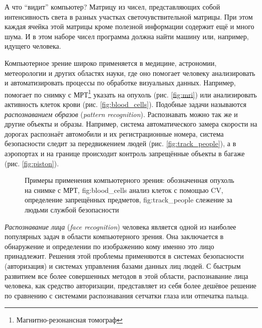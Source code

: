 \documentclass[12pt]{report}
\begin{document}
А что ``видит'' компьютер? Матрицу из чисел, представляющих собой интенсивность света в разных участках 
светочувствительной матрицы. При этом каждая ячейка этой матрицы кроме полезной информации содержит ещё и много 
шума. И в 
этом наборе чисел программа должна найти машину или, например, идущего человека.

Компьютерное зрение широко применяется в медицине, астрономии, метеорологии и других областях науки, где оно 
помогает человеку анализировать и автоматизировать процессы по обработке визуальных данных. 
Например, помогает по снимку с МРТ\footnote{Магнитно-резонансная томограф} указать на опухоль (рис. \ref{fig:mri}) 
или 
анализировать активность клеток крови (рис. \ref{fig:blood_cells}). Подобные задачи называются \emph{распознаванием 
образов} 
(\textit{pattern recognition}). Распознавать можно так же и другие объекты и образы. Например, система 
автоматического 
замера скорости на дорогах распознаёт автомобили и их регистрационные номера, система безопасности следит за
передвижением людей (рис. \ref{fig:track_people}), а в аэропортах и на границе происходит контроль запрещённые 
объекты в багаже (рис. \ref{fig:piston}).

\begin{figure}[h]
	\centering
		
	\caption{Примеры применения компьютерного зрения:  обозначенная опухоль на снимке с МРТ, 
\subref
{fig:blood_cells} анализ клеток с помощью CV,  определение запрещённых предметов, \subref
{fig:track_people} слежение за людьми службой безопасности}
	\label{fig:cv_usage}
\end{figure}


\emph{Распознавание лица} (\textit{face recognition}) человека является одной из наиболее популярных задач в 
области 
компьютерного зрения. Она заключается в обнаружение и определении по изображению кому именно это лицо принадлежит. 
Решения этой проблемы применяются в системах безопасности (авторизация) и системах управления базами данных лиц 
людей. %
С быстрым развитием все более совершенных методов в этой области, распознавание лица человека, как средство 
авторизации, 
представляет из себя более дешёвое решение по сравнению с системами распознавания сетчатки глаза или отпечатка 
пальца. \citep{kumar2006efficient}
\end{document}
